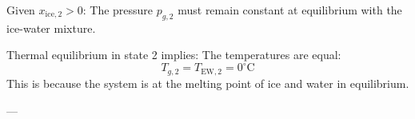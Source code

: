 Given \( x_{\text{ice},2} > 0 \):  
The pressure \( p_{g,2} \) must remain constant at equilibrium with the ice-water mixture.  

Thermal equilibrium in state 2 implies:  
The temperatures are equal:  
\[
T_{g,2} = T_{\text{EW},2} = 0^\circ\text{C}
\]  
This is because the system is at the melting point of ice and water in equilibrium.  

---